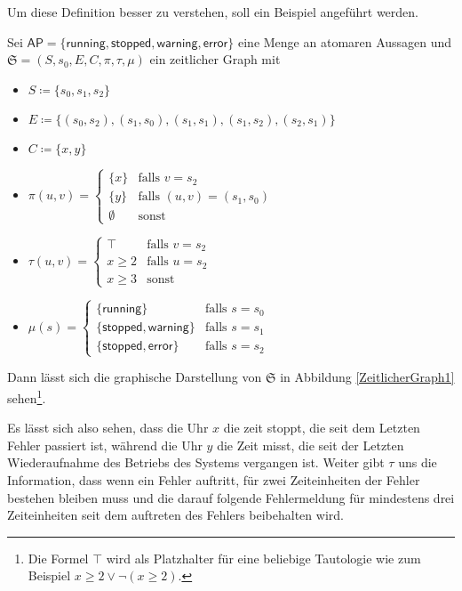 Um diese Definition besser zu verstehen, soll ein Beispiel angeführt werden.
\begin{example}
	Sei $\mathsf{AP}=\{\mathsf{running},\mathsf{stopped},\mathsf{warning},\mathsf{error}\}$ eine Menge an atomaren Aussagen und $\mathfrak{S}=(S,s_0,E,C,\pi,\tau,\mu)$ ein zeitlicher Graph mit
	\begin{itemize}
		\item $S\coloneqq \{s_0,s_1,s_2\}$
		\item $E\coloneqq\{(s_0,s_2),(s_1,s_0),(s_1,s_1),(s_1,s_2),(s_2,s_1)\}$
		\item $C\coloneqq\{x,y\}$
		\item $\pi(u,v) = \begin{cases}
			\{x\} & \text{falls } v = s_2 \\
			\{y\} & \text{falls } (u,v)=(s_1,s_0) \\
			\emptyset & \text{sonst} \end{cases}$
		\item $\tau(u,v) = \begin{cases}
			\top & \text{falls } v = s_2 \\
			x\geq 2 & \text{falls } u = s_2 \\
			x \geq 3 & \text{sonst}
		\end{cases}$
		\item $\mu(s)=\begin{cases}
			\{\mathsf{running}\} & \text{falls } s = s_0 \\
			\{\mathsf{stopped},\mathsf{warning}\} & \text{falls } s = s_1 \\
			\{\mathsf{stopped},\mathsf{error}\} & \text{falls } s = s_2
			\end{cases}$
	\end{itemize}
	Dann lässt sich die graphische Darstellung von $\mathfrak{S}$ in Abbildung \ref{ZeitlicherGraph1} sehen\footnote{Die Formel $\top$ wird als Platzhalter für eine beliebige Tautologie wie zum Beispiel $x \geq 2 \lor \neg(x\geq 2)$.}.
	
	Es lässt sich also sehen, dass die Uhr $x$ die zeit stoppt, die seit dem Letzten Fehler passiert ist, während die Uhr $y$ die Zeit misst, die seit der Letzten Wiederaufnahme des Betriebs des Systems vergangen ist.
	Weiter gibt $\tau$ uns die Information, dass wenn ein Fehler auftritt, für zwei Zeiteinheiten der Fehler bestehen bleiben muss und die darauf folgende Fehlermeldung für mindestens drei Zeiteinheiten seit dem auftreten des Fehlers beibehalten wird.
\end{example}

